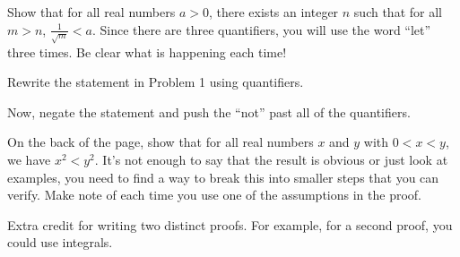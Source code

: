 \yourname


\blist{0in}
\item Show that for all real numbers $a > 0$, there exists an integer $n$ such that for all $m > n$, $\frac{1}{\sqrt{m}} < a$.
Since there are three quantifiers, you will use the word ``let'' three times.
Be clear what is happening each time!

\vfill

\item Rewrite the statement in Problem 1 using quantifiers.

\vspace*{0.5in}

Now, negate the statement and push the ``not'' past all of the quantifiers.

\vspace*{0.5in}

\item On the back of the page, show that for all real numbers $x$ and $y$ with $0 < x < y$, we have $x^2 < y^2$.
It's not enough to say that the result is obvious or just look at examples, you need to find a way to break this into smaller steps that you can verify.
Make note of each time you use one of the assumptions in the proof.

\noindent
Extra credit for writing two distinct proofs.
For example, for a second proof, you could use integrals.
\elist

